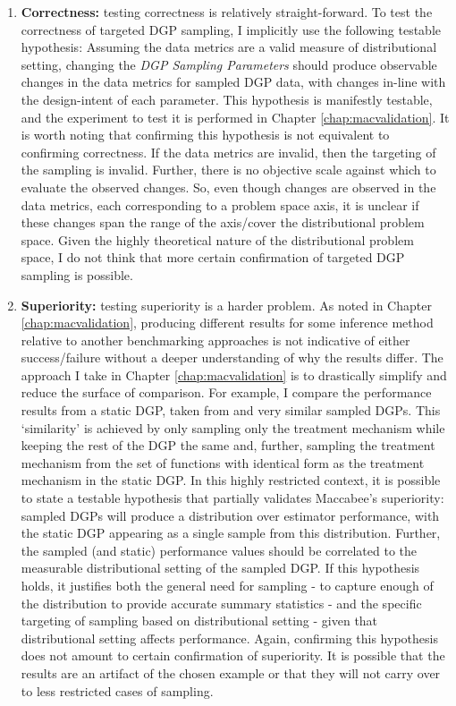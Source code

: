 \documentclass[./main.tex]{subfiles}
\begin{document}
\begin{enumerate}
    \item \textbf{Correctness:} testing correctness is relatively straight-forward. To test the correctness of targeted DGP sampling, I implicitly use the following testable hypothesis: Assuming the data metrics are a valid measure of distributional setting, changing the \textit{DGP Sampling Parameters} should produce observable changes in the data metrics for sampled DGP data, with changes in-line with the design-intent of each parameter. This hypothesis is manifestly testable, and the experiment to test it is performed in Chapter \ref{chap:macvalidation}. It is worth noting that confirming this hypothesis is not equivalent to confirming correctness. If the data metrics are invalid, then the targeting of the sampling is invalid. Further, there is no objective scale against which to evaluate the observed changes. So, even though changes are observed in the data metrics, each corresponding to a problem space axis, it is unclear if these changes span the range of the axis/cover the distributional problem space. Given the highly theoretical nature of the distributional problem space, I do not think that more certain confirmation of targeted DGP sampling is possible.
    
    \item \textbf{Superiority:} testing superiority is a harder problem. As noted in Chapter \ref{chap:macvalidation}, producing different results for some inference method relative to another benchmarking approaches is not indicative of either success/failure without a deeper understanding of why the results differ. The approach I take in Chapter \ref{chap:macvalidation} is to drastically simplify and reduce the surface of comparison. For example, I compare the performance results from a static DGP, taken from \textcite{Diamond2012GeneticStudies} and very similar sampled DGPs. This `similarity' is achieved by only sampling only the treatment mechanism while keeping the rest of the DGP the same and, further, sampling the treatment mechanism from the set of functions with identical form as the treatment mechanism in the static DGP. In this highly restricted context, it is possible to state a testable hypothesis that partially validates Maccabee's superiority: sampled DGPs will produce a distribution over estimator performance, with the static DGP appearing as a single sample from this distribution. Further, the sampled (and static) performance values should be correlated to the measurable distributional setting of the sampled DGP. If this hypothesis holds, it justifies both the general need for sampling - to capture enough of the distribution to provide accurate summary statistics - and the specific targeting of sampling based on distributional setting - given that distributional setting affects performance. Again, confirming this hypothesis does not amount to certain confirmation of superiority. It is possible that the results are an artifact of the chosen example or that they will not carry over to less restricted cases of sampling.
\end{enumerate}
\end{document}
